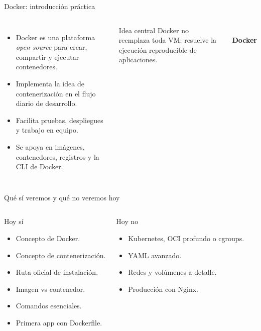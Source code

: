 \documentclass[aspectratio=169]{beamer}
\begin{document}
\begin{frame}{Docker: introducción práctica}
  \begin{columns}[c]
    \footnotesize
    \begin{itemize}
      \item Docker es una plataforma \textit{open source} para crear, compartir y ejecutar contenedores.
      \item Implementa la idea de contenerización en el flujo diario de desarrollo.
      \item Facilita pruebas, despliegues y trabajo en equipo.
      \item Se apoya en imágenes, contenedores, registros y la CLI de Docker.
    \end{itemize}
    \begin{alertblock}{Idea central}
      Docker no reemplaza toda VM: resuelve la ejecución reproducible de aplicaciones.
    \end{alertblock}
    \centering
    {\color{dockerblue}\fontsize{58}{64}\selectfont\faDocker}\\[0.25cm]
    {\Large\textbf{Docker}}
  \end{columns}
\end{frame}

\begin{frame}{Qué sí veremos y qué no veremos hoy}
  \begin{columns}[T]
    \begin{exampleblock}{Hoy sí}
      \begin{itemize}
        \item Concepto de Docker.
        \item Concepto de contenerización.
        \item Ruta oficial de instalación.
        \item Imagen vs contenedor.
        \item Comandos esenciales.
        \item Primera app con Dockerfile.
      \end{itemize}
    \end{exampleblock}
    \begin{alertblock}{Hoy no}
      \begin{itemize}
        \item Kubernetes, OCI profundo o cgroups.
        \item YAML avanzado.
        \item Redes y volúmenes a detalle.
        \item Producción con Nginx.
      \end{itemize}
    \end{alertblock}
  \end{columns}
\end{frame}
\end{document}
